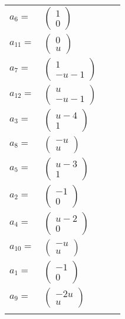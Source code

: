 \documentclass[1p]{elsarticle_modified}
\theoremstyle{definition}
\begin{document}
\begin{tabular}{m{7pt} m{180pt} m{7pt} m{180pt} }
\flushright $a_{6}=$&$\begin{pmatrix}1\\0\end{pmatrix}$ \\
\flushright $a_{11}=$&$\begin{pmatrix}0\\u\end{pmatrix}$ \\
\flushright $a_{7}=$&$\begin{pmatrix}1\\- u-1\end{pmatrix}$ \\
\flushright $a_{12}=$&$\begin{pmatrix}u\\- u-1\end{pmatrix}$ \\
\flushright $a_{3}=$&$\begin{pmatrix}u-4\\1\end{pmatrix}$ \\
\flushright $a_{8}=$&$\begin{pmatrix}- u\\u\end{pmatrix}$ \\
\flushright $a_{5}=$&$\begin{pmatrix}u-3\\1\end{pmatrix}$ \\
\flushright $a_{2}=$&$\begin{pmatrix}-1\\0\end{pmatrix}$ \\
\flushright $a_{4}=$&$\begin{pmatrix}u-2\\0\end{pmatrix}$ \\
\flushright $a_{10}=$&$\begin{pmatrix}- u\\u\end{pmatrix}$ \\
\flushright $a_{1}=$&$\begin{pmatrix}-1\\0\end{pmatrix}$ \\
\flushright $a_{9}=$&$\begin{pmatrix}-2 u\\u\end{pmatrix}$\\&\end{tabular}
\end{document}
